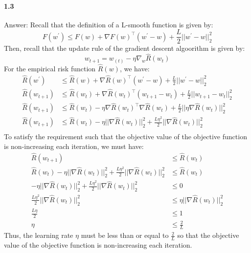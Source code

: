\documentclass[11pt]{article}
\begin{document}
\paragraph{1.3}
Answer:
\newline
Recall that the definition of a L-smooth function is given by:
\begin{equation}
    F(w^\prime)\leq F(w) + \nabla F(w)^\top(w^\prime-w) + \frac{L}{2}||w^\prime-w||_2^2
\end{equation}
Then, recall that the update rule of the gradient descent algoorithm is given by:
\begin{equation}
    w_{t+1} = w_{(t)} - \eta\nabla_w \hat{R}(w_{t})
\end{equation}
For the empirical risk function $\hat{R}(w)$, we have:
\begin{equation}
    \begin{split}
        \hat{R}(w^\prime) &\leq \hat{R}(w) + \nabla \hat{R}(w)^\top(w^\prime-w) + \frac{L}{2}||w^\prime-w||_2^2\\
        \hat{R}(w_{t+1}) &\leq \hat{R}(w_t) + \nabla \hat{R}(w_t)^\top(w_{t+1}-w_t) + \frac{L}{2}||w_{t+1}-w_t||_2^2\\
        \hat{R}(w_{t+1}) &\leq \hat{R}(w_t) - \eta\nabla \hat{R}(w_t)^\top\nabla \hat{R}(w_t) + \frac{L}{2}||\eta\nabla \hat{R}(w_t)||_2^2\\
        \hat{R}(w_{t+1}) &\leq \hat{R}(w_t) - \eta||\nabla \hat{R}(w_t)||_2^2 + \frac{L\eta^2}{2}||\nabla \hat{R}(w_t)||_2^2\\
    \end{split}
\end{equation}
To satisfy the requirement such that the objective value of the objective function is non-increasing each iteration, we must have:
\begin{equation}
    \begin{split}
        \hat{R}(w_{t+1}) &\leq \hat{R}(w_t)\\
        \hat{R}(w_t) - \eta||\nabla \hat{R}(w_t)||_2^2 + \frac{L\eta^2}{2}||\nabla \hat{R}(w_t)||_2^2 &\leq \hat{R}(w_t)\\
        - \eta||\nabla \hat{R}(w_t)||_2^2 + \frac{L\eta^2}{2}||\nabla \hat{R}(w_t)||_2^2 &\leq 0\\
        \frac{L\eta^2}{2}||\nabla \hat{R}(w_t)||_2^2 &\leq \eta||\nabla \hat{R}(w_t)||_2^2\\
        \frac{L\eta}{2} &\leq 1\\
        \eta &\leq \frac{2}{L}
    \end{split}
\end{equation}
Thus, the learning rate $\eta$ must be less than or equal to $\frac{2}{L}$ so that the objective value of the objective function is non-increasing each iteration.
\end{document}
